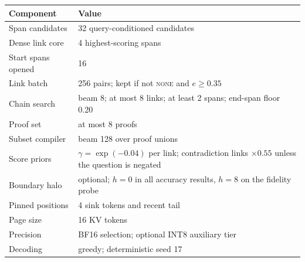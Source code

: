 \begin{tabular}{@{}p{}p{}@{}}
\toprule
Component & Value \\
\midrule
Span candidates & 32 query-conditioned candidates \\
Dense link core & 4 highest-scoring spans \\
Start spans opened & 16 \\
Link batch & 256 pairs; kept if not \textsc{none} and $e\ge0.35$ \\
Chain search & beam 8; at most 8 links; at least 2 spans; end-span floor 0.20 \\
Proof set & at most 8 proofs \\
Subset compiler & beam 128 over proof unions \\
Score priors & $\gamma=\exp(-0.04)$ per link; contradiction links $\times0.55$ unless the question is negated \\
Boundary halo & optional; $h{=}0$ in all accuracy results, $h{=}8$ on the fidelity probe \\
Pinned positions & 4 sink tokens and recent tail \\
Page size & 16 KV tokens \\
Precision & BF16 selection; optional INT8 auxiliary tier \\
Decoding & greedy; deterministic seed 17 \\
\bottomrule
\end{tabular}
